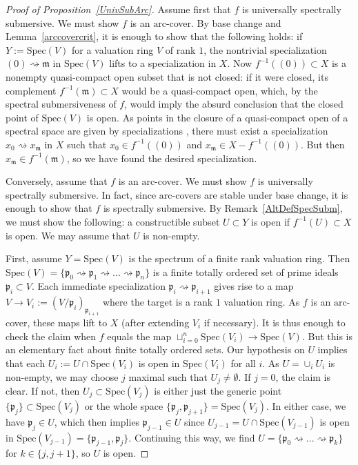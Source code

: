 \documentclass[reqno]{amsart}
\newcommand{\arc}{\mathrm{arc}}
\theoremstyle{definition}
\begin{document}
\begin{proof}[Proof of Proposition~\ref{UnivSubArc}]
Assume first that $f$ is universally spectrally submersive. We must show $f$ is
an $\arc$-cover. By base change and Lemma~\ref{arccovercrit}, it is enough to
show that the following holds: if $Y := \mathrm{Spec}(V)$ for a valuation ring
$V$ of rank $1$, the nontrivial specialization $(0) \rightsquigarrow
\mathfrak{m}$ in $\mathrm{Spec}(V)$ lifts to a specialization in $X$.  Now
$f^{-1}( (0)) \subset X$ is a nonempty quasi-compact open subset that is not
closed: if it were closed, its complement $f^{-1}(\mathfrak{m}) \subset X$
would be a quasi-compact open, which, by the spectral submersiveness of $f$, would imply the absurd conclusion that the closed point of $\mathrm{Spec}(V)$ is open.  As points in the closure of a quasi-compact open of a spectral space are given by specializations \cite[Tag 0903]{stacks-project}, there must exist a specialization $x_0 \rightsquigarrow x_{\mathfrak{m}}$ in $X$ such that $x_0 \in f^{-1}( (0))$ and $x_{\mathfrak{m}} \in X - f^{-1}( (0))$. But then $x_{\mathfrak{m}} \in f^{-1}(\mathfrak{m})$, so we have found the desired specialization.

Conversely, assume that $f$ is an $\arc$-cover. We must show $f$ is universally
spectrally submersive. In fact, since $\arc$-covers are stable under base
change, it is enough to show that $f$ is spectrally submersive. By
Remark~\ref{AltDefSpecSubm}, we must show the following: a constructible subset
$U \subset Y$ is open if $f^{-1}(U) \subset X$ is open. We may assume that $U$ is non-empty. 

First, assume $Y = \mathrm{Spec}(V)$ is the spectrum of a finite rank valuation ring. Then $\mathrm{Spec}(V) = \{\mathfrak{p}_0
\rightsquigarrow \mathfrak{p}_1 \rightsquigarrow ... \rightsquigarrow
\mathfrak{p}_n\}$ is a finite totally ordered set of prime ideals $\mathfrak{p}_i \subset V$. Each immediate specialization
$\mathfrak{p}_i \rightsquigarrow \mathfrak{p}_{i+1}$ gives rise to a map $V \to
V_i := (V/\mathfrak{p}_i)_{\mathfrak{p}_{i+1}}$ where the target is a rank $1$
valuation ring. As $f$ is an $\arc$-cover, these maps lift to $X$ (after extending $V_i$ if necessary). It is thus enough to check the claim when $f$ equals the
map $\sqcup_{i=0}^n \mathrm{Spec}( V_i) \to \mathrm{Spec}(V)$. But this is an
elementary fact about finite totally ordered sets. Our hypothesis on $U$ implies that each $U_i := U \cap \mathrm{Spec}(V_i)$ is open in $\mathrm{Spec}(V_i)$ for all $i$. As $U = \cup_i U_i$ is non-empty, we may choose $j$ maximal such that $U_j \neq \emptyset$. If $j=0$, the claim is clear. If not, then $U_j \subset \mathrm{Spec}(V_j)$ is either just the generic point $\{\mathfrak{p}_j\} \subset \mathrm{Spec}(V_j)$ or the whole space $\{\mathfrak{p}_j,\mathfrak{p}_{j+1}\} = \mathrm{Spec}(V_j)$. In either case, we have $\mathfrak{p}_j \in U$, which then implies $\mathfrak{p}_{j-1} \in U$ since $U_{j-1} = U \cap \mathrm{Spec}(V_{j-1})$ is open in $\mathrm{Spec}(V_{j-1}) = \{\mathfrak{p}_{j-1},\mathfrak{p}_j\}$. Continuing this way, we find $U = \{\mathfrak{p}_0 \rightsquigarrow ... \rightsquigarrow \mathfrak{p}_k\}$ for $k \in \{j,j+1\}$, so $U$ is open. 


\end{proof}
\end{document}
